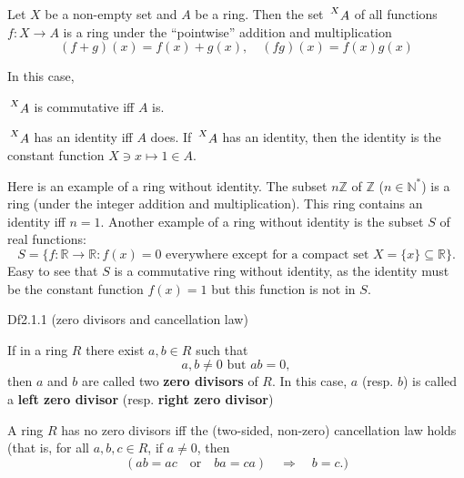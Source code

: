 \documentclass{article}
\begin{document}
\begin{Rmk_continued}{}
\begin{compactenum}
        \item \textcolor{Th}{Let $X$ be a non-empty set and $A$ be a ring. Then the set $\sideset{^X}{} {\mathop{A}}$ of all functions $f: X \to A$ is a ring under the ``pointwise'' addition and multiplication
        $$ (f + g)(x) = f(x) + g(x), \quad (fg)(x) = f(x)g(x) $$}
        \textcolor{Th}{In this case,
        \begin{compactenum}
            \item $\sideset{^X}{} {\mathop{A}}$ is commutative iff $A$ is.
            \item $\sideset{^X}{} {\mathop{A}}$ has an identity iff $A$ does. If $\sideset{^X}{} {\mathop{A}}$ has an identity, then the identity is the constant function $ X\ni x\mapsto 1 \in A $.
        \end{compactenum}}
        \item Here is an example of a ring without identity. \textcolor{Th}{The subset $n\mathbb{Z}$ of $\mathbb{Z}$ ($n\in\mathbb{N}^\ast$) is a ring (under the integer addition and multiplication). This ring contains an identity iff $n=1$.} Another example of a ring without identity is the subset $S$ of real functions:
        $$ S = \{f: \mathbb{R} \to \mathbb{R}: f(x) = 0 \text{ everywhere except for a compact set } X = \{x\} \subseteq\mathbb{R} \}. $$
        \textcolor{Th}{Easy to see that $S$ is a commutative ring without identity, as the identity must be the constant function $f(x) = 1$ but this function is not in $S$.}
    \end{compactenum}
\end{Rmk_continued}

\begin{Df}{Df2.1.1 (zero divisors and cancellation law)}
    \begin{compactenum}
        \item If in a ring $R$ there exist $a, b \in R$ such that 
        $$ a, b \neq 0 \text{ but } ab = 0, $$
        then $a$ and $b$ are called two \textbf{zero divisors} of $R$. In this case, $a$ (resp. $b$) is called a \textbf{left zero divisor} (resp. \textbf{right zero divisor}) 
        \item \textcolor{Th}{A ring $R$ has no zero divisors iff the (two-sided, non-zero) cancellation law holds (that is, for all $a, b, c \in R$, if $a\neq 0$, then
        $$ \left( ab = ac \quad\text{or}\quad ba = ca \right) \quad\Rightarrow\quad b = c. )$$}
    \end{compactenum}
\end{Df}
\end{document}
